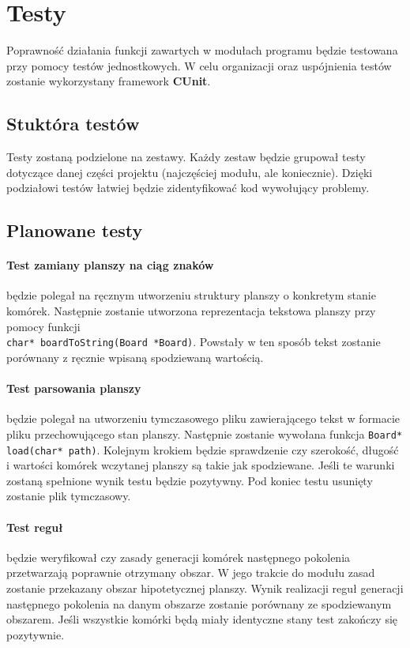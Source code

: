 \documentclass{article}
\begin{document}
\section{Testy}
Poprawność działania funkcji zawartych w modułach programu będzie testowana przy pomocy testów jednostkowych. W celu organizacji oraz uspójnienia testów zostanie wykorzystany framework \textbf{CUnit}.

\subsection{Stuktóra testów}
Testy zostaną podzielone na zestawy. Każdy zestaw będzie grupował testy dotyczące danej części projektu (najczęściej modułu, ale koniecznie). Dzięki podziałowi testów łatwiej będzie zidentyfikować kod wywołujący problemy.

\subsection{Planowane testy}

\paragraph{Test zamiany planszy na ciąg znaków} będzie polegał na ręcznym utworzeniu struktury planszy o konkretym stanie komórek. Następnie zostanie utworzona reprezentacja tekstowa planszy przy pomocy funkcji \\ \texttt{char* boardToString(Board *Board)}. Powstały w ten sposób tekst zostanie porównany z ręcznie wpisaną spodziewaną wartością.

\paragraph{Test parsowania planszy} będzie polegał na utworzeniu tymczasowego pliku zawierającego tekst w formacie pliku przechowującego stan planszy. Następnie zostanie wywołana funkcja \texttt{Board* load(char* path)}. Kolejnym krokiem będzie sprawdzenie czy szerokość, długość i wartości komórek wczytanej planszy są takie jak spodziewane. Jeśli te warunki zostaną spełnione wynik testu będzie pozytywny. Pod koniec testu usunięty zostanie plik tymczasowy.

\paragraph{Test reguł} będzie weryfikował czy zasady generacji komórek następnego pokolenia przetwarzają poprawnie otrzymany obszar. W jego trakcie do modułu zasad zostanie przekazany obszar hipotetycznej planszy. Wynik realizacji reguł generacji następnego pokolenia na danym obszarze zostanie porównany ze spodziewanym obszarem. Jeśli wszystkie komórki będą miały identyczne stany test zakończy się pozytywnie.
\end{document}
